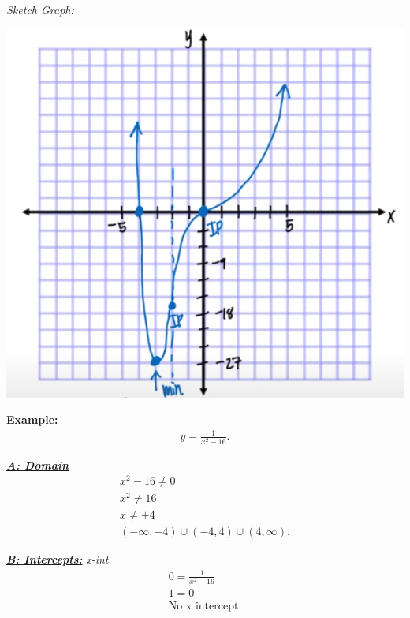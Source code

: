 \documentclass{report}
\begin{document}
  \bigbreak \noindent 
  \textit{Sketch Graph:}

  \bigbreak \noindent 
  \begin{center}
    \includegraphics[scale=0.7]{ ./images/17.png }
  \end{center}

  \bigbreak \noindent 
  \begin{mdframed}
    \textbf{Example:}
    \begin{align*}
      y= \frac{1}{x^{2}-16}
    .\end{align*}
  \end{mdframed}

  \bigbreak \noindent 
  \textbf{\textit{\underline{A: Domain}}}
  \begin{align*}
    x^{2} - 16 \neq 0 \\
    x^{2} \neq 16 \\
    x \neq \pm 4 \\
    \boxed{(-\infty, -4) \cup (-4,4) \cup (4,\infty)}
  .\end{align*}

  \bigbreak \noindent 
  \textbf{\textit{\underline{B: Intercepts:}}}
  \bigbreak \noindent 
  \textit{x-int}
  \begin{align*}
   0 = \frac{1}{x^{2}-16} \\
   1= 0 \\
   \boxed{\text{No x intercept}}
  .\end{align*}
\end{document}
